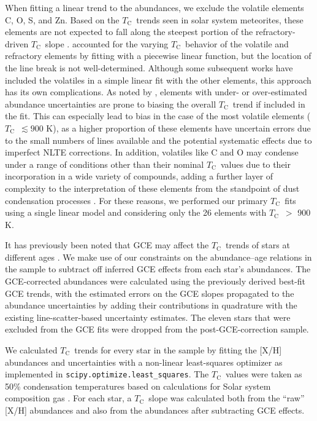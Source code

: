 \documentclass[twocolumn]{aastex62}
\newcommand{\tc}{$T_\mathrm{C}$}
\newcommand{\acronym}[1]{{\small{#1}}}
\begin{document}
When fitting a linear trend to the abundances, we exclude the volatile elements C, O, S, and Zn. Based on the \tc\ trends seen in solar system meteorites, these elements are not expected to fall along the steepest portion of the refractory-driven \tc\ slope \citep[][and references therein]{chambers10}. \citet{melendez09} accounted for the varying \tc\ behavior of the volatile and refractory elements by fitting with a piecewise linear function, but the location of the line break is not well-determined. Although some subsequent works have included the volatiles in a simple linear fit with the other elements, this approach has its own complications. As noted by \citet{adibekyan16}, elements with under- or over-estimated abundance uncertainties are prone to biasing the overall \tc\ trend if included in the fit. This can especially lead to bias in the case of the most volatile elements (\tc\ $\lesssim 900$ K), as a higher proportion of these elements have uncertain errors due to the small numbers of lines available and the potential systematic effects due to imperfect \acronym{NLTE} corrections. 
In addition, volatiles like C and O may condense under a range of conditions other than their nominal \tc\ values due to their incorporation in a wide variety of compounds, adding a further layer of complexity to the interpretation of these elements from the standpoint of dust condensation processes \citep{lodders03}. For these reasons, we performed our primary \tc\ fits using a single linear model and considering only the 26 elements with \tc\ $>$ 900 K.

It has previously been noted that \acronym{GCE} may affect the \tc\ trends of stars at different ages \citep{adibekyan14}. We make use of our constraints on the abundance--age relations in the sample to subtract off inferred \acronym{GCE} effects from each star's abundances. The \acronym{GCE}-corrected abundances were calculated using the previously derived best-fit \acronym{GCE} trends, with the estimated errors on the \acronym{GCE} slopes propagated to the abundance uncertainties by adding their contributions in quadrature with the existing line-scatter-based uncertainty estimates. The eleven stars that were excluded from the \acronym{GCE} fits were dropped from the post-\acronym{GCE}-correction sample.

We calculated \tc\ trends for every star in the sample by fitting the [X/H] abundances and uncertainties with a non-linear least-squares optimizer as implemented in \texttt{scipy.optimize.least\_squares}. The \tc\ values were taken as 50\% condensation temperatures based on calculations for Solar system composition gas \citep{lodders03}. For each star, a \tc\ slope was calculated both from the ``raw'' [X/H] abundances and also from the abundances after subtracting \acronym{GCE} effects. 
\end{document}
